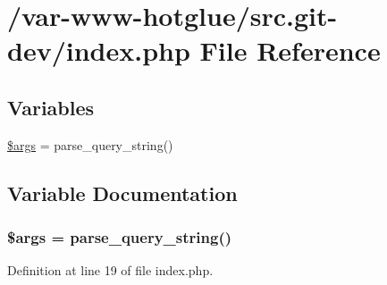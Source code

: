 \hypertarget{index_8php}{
\section{/var-\/www-\/hotglue/src.git-\/dev/index.php File Reference}
\label{index_8php}
}
\subsection*{Variables}
\begin{DoxyCompactItemize}
\item 
\hyperlink{index_8php_a67e94494731d99ed23b123e95175bc10}{\$args} = parse\_\-query\_\-string()
\end{DoxyCompactItemize}


\subsection{Variable Documentation}
\hypertarget{index_8php_a67e94494731d99ed23b123e95175bc10}{
\subsubsection[{\$args}]{\setlength{\rightskip}{0pt plus 5cm}\$args = parse\_\-query\_\-string()}}
\label{index_8php_a67e94494731d99ed23b123e95175bc10}


Definition at line 19 of file index.php.

